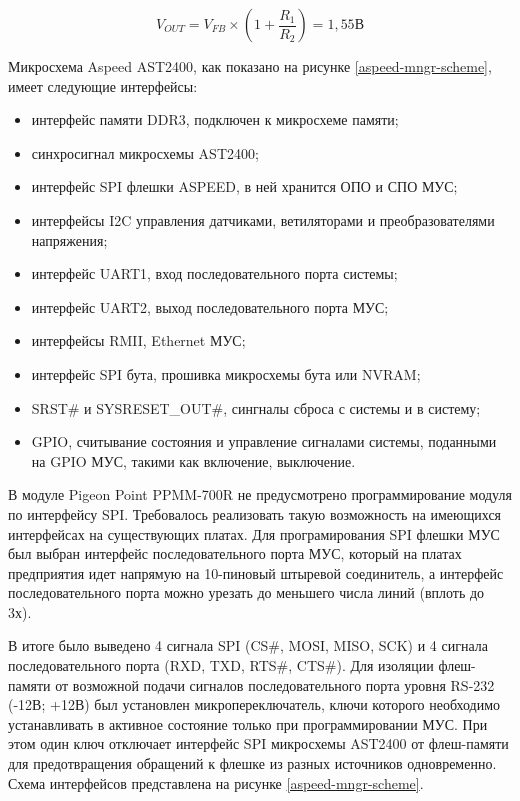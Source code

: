 \begin{equation}
V_{OUT} = V_{FB} \times \left(1 + \frac{R_{1}}{R_{2}} \right) = 1,55\text{В}
\end{equation}

Микросхема Aspeed AST2400, как показано на рисунке \ref{aspeed-mngr-scheme}, имеет следующие интерфейсы:

\begin{itemize}
	\item интерфейс памяти DDR3, подключен к микросхеме памяти;
	\item синхросигнал микросхемы AST2400;
	\item интерфейс SPI флешки ASPEED, в ней хранится ОПО и СПО МУС;
	\item интерфейсы I2C управления датчиками, ветиляторами и преобразователями напряжения;
	\item интерфейс UART1, вход последовательного порта системы;
	\item интерфейс UART2, выход последовательного порта МУС;
	\item интерфейсы RMII, Ethernet МУС;
	\item интерфейс SPI бута, прошивка микросхемы бута или NVRAM;
	\item SRST\# и SYSRESET\_OUT\#, сингналы сброса с системы и в систему;
	\item GPIO, считывание состояния и управление сигналами системы, поданными на GPIO МУС, такими как включение, выключение.
\end{itemize}

В модуле Pigeon Point PPMM-700R не предусмотрено программирование модуля по интерфейсу SPI. Требовалось реализовать такую возможность на имеющихся интерфейсах на существующих платах. Для програмирования SPI флешки МУС был выбран интерфейс последовательного порта МУС, который на платах предприятия идет напрямую на 10-пиновый штыревой соединитель, а интерфейс последовательного порта можно урезать до меньшего числа линий (вплоть до 3х).

В итоге было выведено 4 сигнала SPI (CS\#, MOSI, MISO, SCK) и 4 сигнала последовательного порта (RXD, TXD, RTS\#, CTS\#). Для изоляции флеш-памяти от возможной подачи сигналов последовательного порта уровня RS-232 (-12В; +12В) был установлен микропереключатель, ключи которого необходимо устанавливать в активное состояние только при программировании МУС. При этом один ключ отключает интерфейс SPI микросхемы AST2400 от флеш-памяти для предотвращения обращений к флешке из разных источников одновременно. Схема интерфейсов представлена на рисунке \ref{aspeed-mngr-scheme}.

